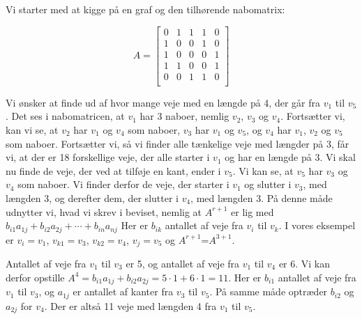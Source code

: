 \begin{exmp}
Vi starter med at kigge på en graf og den tilhørende nabomatrix:


\begin{equation}
A=\begin{bmatrix}
    0&1&1&1&0\\
    1&0&0&1&0\\
    1&0&0&0&1\\
    1&1&0&0&1\\
    0&0&1&1&0\\
\end{bmatrix}
\end{equation}


Vi ønsker at finde ud af hvor mange veje med en længde på 4, der går fra $v_1$ til $v_5$. Det ses i nabomatricen, at $v_1$ har 3 naboer, nemlig $v_2$, $v_3$ og $v_4$. Fortsætter vi, kan vi se, at $v_2$ har $v_1$ og $v_4$ som naboer, $v_3$ har $v_1$ og $v_5$, og $v_4$ har $v_1$, $v_2$ og $v_5$ som naboer. Fortsætter vi, så vi finder alle tænkelige veje med længder på 3, får vi, at der er 18 forskellige veje, der alle starter i $v_1$ og har en længde på 3. Vi skal nu finde de veje, der ved at tilføje en kant, ender i $v_5$. Vi kan se, at $v_5$ har $v_3$ og $v_4$ som naboer. Vi finder derfor de veje, der starter i $v_1$ og slutter i $v_3$, med længden 3, og derefter dem, der slutter i $v_4$, med længden 3. På denne måde udnytter vi, hvad vi skrev i beviset, nemlig at
\textbf{$A^{r+1}$} er lig med $b_{i1}a_{1j} + b_{i2}a_{2j} +\dotsb+ b_{in}a_{nj}$
Her er $b_{ik}$ antallet af veje fra $v_{i}$ til ${v_k}$. I vores eksempel er $v_{i}=v_{1}$, ${v_{k1}}=v_{3}$, ${v_{k2}}=v_{4}$, $v_{j}=v_{5}$ og \textbf{$A^{r+1}$}=\textbf{$A^{3+1}$}. 
 


Antallet af veje fra $v_{1}$ til $v_{3}$ er 5, og antallet af veje fra $v_{1}$ til $v_{4}$ er 6. Vi kan derfor opstille
\textbf{$A^{4}$}$=b_{i1} a_{1j}+b_{i2} a_{2j}=5 \cdot 1+6 \cdot 1=11$.
Her er $b_{i1}$ antallet af veje fra $v_{1}$ til $v_{3}$, og $a_{1j}$ er antallet af kanter fra $v_{3}$ til  $v_{5}$. På samme måde optræder $b_{i2}$ og $a_{2j}$ for $v_{4}$. Der er altså 11 veje med længden 4 fra $v_{1}$ til $v_{5}$.

\end{exmp}

